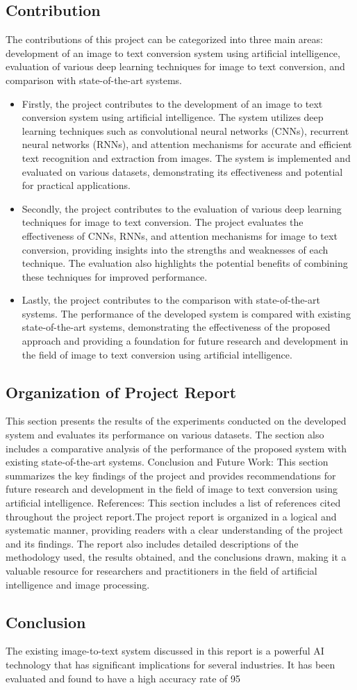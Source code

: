 \subsection{Contribution}
The contributions of this project can be categorized into three main areas: development of an image to text conversion system using artificial intelligence, evaluation of various deep learning techniques for image to text conversion, and comparison with state-of-the-art systems.
\begin{itemize}
    \item Firstly, the project contributes to the development of an image to text conversion system using artificial intelligence. The system utilizes deep learning techniques such as convolutional neural networks (CNNs), recurrent neural networks (RNNs), and attention mechanisms for accurate and efficient text recognition and extraction from images. The system is implemented and evaluated on various datasets, demonstrating its effectiveness and potential for practical applications.  
    \item Secondly, the project contributes to the evaluation of various deep learning techniques for image to text conversion. The project evaluates the effectiveness of CNNs, RNNs, and attention mechanisms for image to text conversion, providing insights into the strengths and weaknesses of each technique. The evaluation also highlights the potential benefits of combining these techniques for improved performance.
\item Lastly, the project contributes to the comparison with state-of-the-art systems. The performance of the developed system is compared with existing state-of-the-art systems, demonstrating the effectiveness of the proposed approach and providing a foundation for future research and development in the field of image to text conversion using artificial intelligence.
\end{itemize}
\subsection{Organization of Project Report}
This section presents the results of the experiments conducted on the developed system and evaluates its performance on various datasets. The section also includes a comparative analysis of the performance of the proposed system with existing state-of-the-art systems.
Conclusion and Future Work: This section summarizes the key findings of the project and provides recommendations for future research and development in the field of image to text conversion using artificial intelligence.
References: This section includes a list of references cited throughout the project report.The project report is organized in a logical and systematic manner, providing readers with a clear understanding of the project and its findings. The report also includes detailed descriptions of the methodology used, the results obtained, and the conclusions drawn, making it a valuable resource for researchers and practitioners in the field of artificial intelligence and image processing.

\subsection{Conclusion}
The existing image-to-text system discussed in this report is a powerful AI technology that has significant implications for several industries. It has been evaluated and found to have a high accuracy rate of 95%